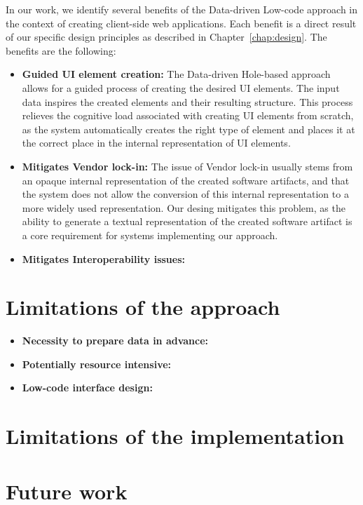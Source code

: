 In our work, we identify several benefits of the Data-driven Low-code approach in the context of creating client-side web applications.
Each benefit is a direct result of our specific design principles as described in Chapter~\ref{chap:design}.
The benefits are the following:
\begin{itemize}
	\item \textbf{Guided UI element creation:} The Data-driven Hole-based approach allows for a guided process of creating the desired UI elements.
	      The input data inspires the created elements and their resulting structure.
	      This process relieves the cognitive load associated with creating UI elements from scratch, as the system automatically creates the right type
	      of element and places it at the correct place in the internal representation of UI elements.
	\item \textbf{Mitigates Vendor lock-in:} The issue of Vendor lock-in usually stems from an opaque internal representation of the created software artifacts,
	      and that the system does not allow the conversion of this internal representation to a more widely used representation.
	      Our desing mitigates this problem, as the ability to generate a textual representation of the created software artifact is a core requirement
	      for systems implementing our approach.
	\item \textbf{Mitigates Interoperability issues:}
\end{itemize}


\section{Limitations of the approach}

\begin{itemize}
	\item \textbf{Necessity to prepare data in advance:}
	\item \textbf{Potentially resource intensive:}
	\item \textbf{Low-code interface design:}
\end{itemize}

\section{Limitations of the implementation}

\section{Future work}

